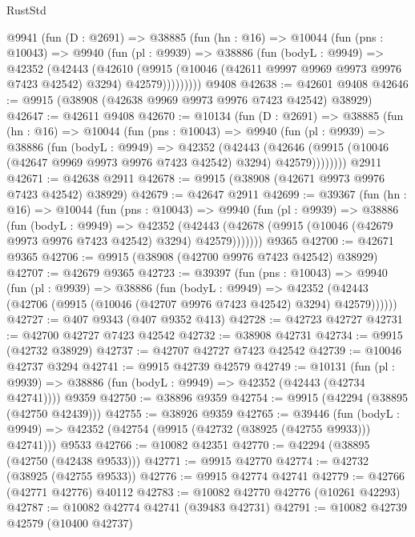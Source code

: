 \begin{lexlean}{RustStd}
\begin{coremodule}
    @9941
      (fun (D : @2691) =>
      @38885
        (fun (hn : @16) =>
        @10044
          (fun (pns : @10043) =>
          @9940
            (fun (pl : @9939) =>
            @38886
              (fun (bodyL : @9949) =>
              @42352
                (@42443
                  (@42610
                    (@9915
                      (@10046 (@42611 @9997 @9969 @9973 @9976 @7423 @42542) @3294)
                      @42579)))))))))
    @9408
@42638 := @42601 @9408
@42646 := @9915 (@38908 (@42638 @9969 @9973 @9976 @7423 @42542) @38929)
@42647 := @42611 @9408
@42670 := @10134
    (fun (D : @2691) =>
    @38885
      (fun (hn : @16) =>
      @10044
        (fun (pns : @10043) =>
        @9940
          (fun (pl : @9939) =>
          @38886
            (fun (bodyL : @9949) =>
            @42352
              (@42443
                (@42646 (@9915 (@10046 (@42647 @9969 @9973 @9976 @7423 @42542) @3294) @42579))))))))
    @2911
@42671 := @42638 @2911
@42678 := @9915 (@38908 (@42671 @9973 @9976 @7423 @42542) @38929)
@42679 := @42647 @2911
@42699 := @39367
    (fun (hn : @16) =>
    @10044
      (fun (pns : @10043) =>
      @9940
        (fun (pl : @9939) =>
        @38886
          (fun (bodyL : @9949) =>
          @42352
            (@42443 (@42678 (@9915 (@10046 (@42679 @9973 @9976 @7423 @42542) @3294) @42579)))))))
    @9365
@42700 := @42671 @9365
@42706 := @9915 (@38908 (@42700 @9976 @7423 @42542) @38929)
@42707 := @42679 @9365
@42723 := @39397
    (fun (pns : @10043) =>
    @9940
      (fun (pl : @9939) =>
      @38886
        (fun (bodyL : @9949) =>
        @42352 (@42443 (@42706 (@9915 (@10046 (@42707 @9976 @7423 @42542) @3294) @42579))))))
@42727 := @407 @9343 (@407 @9352 @413)
@42728 := @42723 @42727
@42731 := @42700 @42727 @7423 @42542
@42732 := @38908 @42731
@42734 := @9915 (@42732 @38929)
@42737 := @42707 @42727 @7423 @42542
@42739 := @10046 @42737 @3294
@42741 := @9915 @42739 @42579
@42749 := @10131
    (fun (pl : @9939) => @38886 (fun (bodyL : @9949) => @42352 (@42443 (@42734 @42741))))
    @9359
@42750 := @38896 @9359
@42754 := @9915 (@42294 (@38895 (@42750 @42439)))
@42755 := @38926 @9359
@42765 := @39446
    (fun (bodyL : @9949) => @42352 (@42754 (@9915 (@42732 (@38925 (@42755 @9933))) @42741)))
    @9533
@42766 := @10082 @42351
@42770 := @42294 (@38895 (@42750 (@42438 @9533)))
@42771 := @9915 @42770
@42774 := @42732 (@38925 (@42755 @9533))
@42776 := @9915 @42774 @42741
@42779 := @42766 (@42771 @42776) @40112
@42783 := @10082 @42770 @42776 (@10261 @42293)
@42787 := @10082 @42774 @42741 (@39483 @42731)
@42791 := @10082 @42739 @42579 (@10400 @42737)

\end{coremodule}
\end{lexlean}
